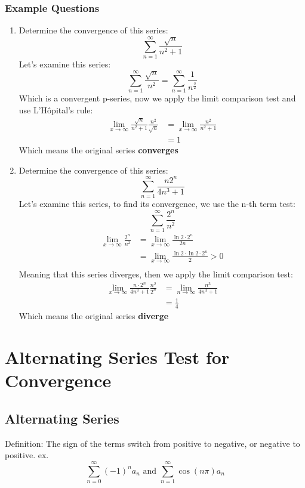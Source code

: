 \documentclass{article}
\numberwithin{equation}{section}
\begin{document}
\subsubsection{Example Questions}
\begin{enumerate}
    \item Determine the convergence of this series:
    \[
        \sum_{n = 1}^{\infty} \frac{\sqrt{n}}{n^2 + 1}
    \]
    Let's examine this series:
    \[
        \sum_{n = 1}^{\infty} \frac{\sqrt{n}}{n^2} = \sum_{n = 1}^{\infty} \frac{1}{n^{\frac{3}{2}}}
    \]
    Which is a convergent p-series, now we apply the limit comparison test and use L'Hôpital's rule:
    \[
        \begin{split}
            \lim_{x\to \infty} \frac{\sqrt{n}}{n^2 + 1} \frac{n^2}{\sqrt{n}} & = \lim_{x\to \infty} \frac{n^2}{n^2 + 1}\\
            & = 1
        \end{split}
    \]
    Which means the original series \textbf{converges}

    \newpage
    \item Determine the convergence of this series:
    \[
        \sum_{n = 1}^{\infty} \frac{n2^n}{4n^3 + 1}
    \]
    Let's examine this series, to find its convergence, we use the n-th term test:
    \[
        \sum_{n = 1}^{\infty} \frac{2^n}{n^2}
    \]
    \[
    \begin{split}
        \lim_{x\to \infty} \frac{2^n}{n^2} & = \lim_{x\to \infty} \frac{\ln 2\cdot 2^n}{2n}\\
        & = \lim_{x\to \infty} \frac{\ln 2 \cdot \ln 2 \cdot 2^n}{2} > 0\\
    \end{split}
    \]
    Meaning that this series diverges, then we apply the limit comparison test:
    \[
        \begin{split}
            \lim_{x\to \infty} \frac{n\cdot 2^n}{4n^3 + 1} \frac{n^2}{2^n} & = \lim_{n\to \infty} \frac{n^3}{4n^3 + 1}\\
            & = \frac{1}{4}
        \end{split}
    \]
    Which means the original series \textbf{diverge}
\end{enumerate}

\newpage
\section{Alternating Series Test for Convergence}
\subsection{Alternating Series}
Definition: The sign of the terms switch from positive to negative, or negative to positive.
ex.
\[
    \sum_{n = 0}^{\infty} (-1)^n a_n \text{ and } \sum_{n = 1}^{\infty} \cos(n\pi) a_n
\]
\end{document}
